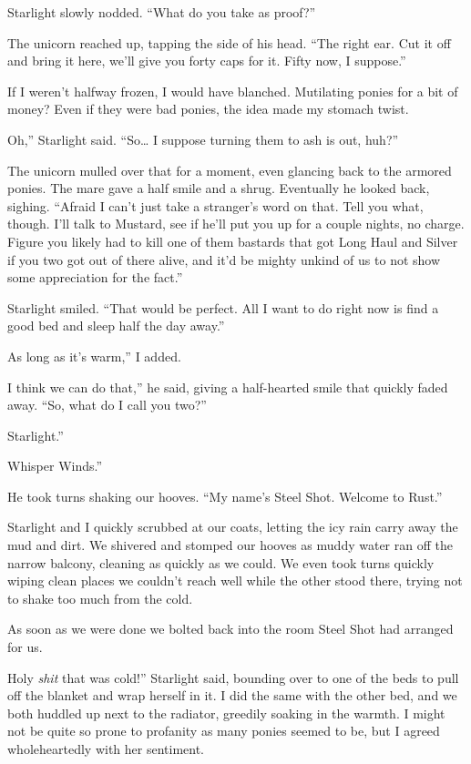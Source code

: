 Starlight slowly nodded. “What do you take as proof?”

The unicorn reached up, tapping the side of his head. “The right ear. Cut it off and bring it here, we’ll give you forty caps for it. Fifty now, I suppose.”

If I weren’t halfway frozen, I would have blanched. Mutilating ponies for a bit of money? Even if they were bad ponies, the idea made my stomach twist.

\leavevmode{}Oh,” Starlight said. “So… I suppose turning them to ash is out, huh?”

The unicorn mulled over that for a moment, even glancing back to the armored ponies. The mare gave a half smile and a shrug. Eventually he looked back, sighing. “Afraid I can’t just take a stranger’s word on that. Tell you what, though. I’ll talk to Mustard, see if he’ll put you up for a couple nights, no charge. Figure you likely had to kill one of them bastards that got Long Haul and Silver if you two got out of there alive, and it’d be mighty unkind of us to not show some appreciation for the fact.”

Starlight smiled. “That would be perfect. All I want to do right now is find a good bed and sleep half the day away.”

\leavevmode{}As long as it’s warm,” I added.

\leavevmode{}I think we can do that,” he said, giving a half-hearted smile that quickly faded away. “So, what do I call you two?”

\leavevmode{}Starlight.”

\leavevmode{}Whisper Winds.”

He took turns shaking our hooves. “My name’s Steel Shot. Welcome to Rust.”

{\br}%
Starlight and I quickly scrubbed at our coats, letting the icy rain carry away the mud and dirt. We shivered and stomped our hooves as muddy water ran off the narrow balcony, cleaning as quickly as we could. We even took turns quickly wiping clean places we couldn’t reach well while the other stood there, trying not to shake too much from the cold.

As soon as we were done we bolted back into the room Steel Shot had arranged for us.

\leavevmode{}Holy \textit{shit} that was cold!” Starlight said, bounding over to one of the beds to pull off the blanket and wrap herself in it. I did the same with the other bed, and we both huddled up next to the radiator, greedily soaking in the warmth. I might not be quite so prone to profanity as many ponies seemed to be, but I agreed wholeheartedly with her sentiment.

